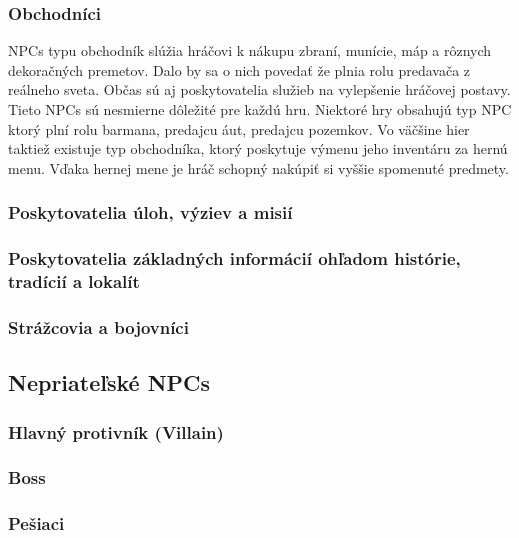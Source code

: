 \documentclass[10pt,twoside,slovak,a4paper]{article}
\begin{document}
\subsubsection{Obchodníci}
NPCs typu obchodník slúžia hráčovi k nákupu zbraní, munície, máp a rôznych dekoračných premetov. Dalo by sa o nich povedať že plnia rolu predavača z reálneho sveta. Občas sú aj poskytovatelia služieb na vylepšenie hráčovej postavy. Tieto NPCs sú nesmierne dôležité pre každú hru. Niektoré hry obsahujú typ NPC ktorý plní rolu barmana, predajcu áut, predajcu pozemkov. Vo väčšine hier taktiež existuje typ obchodníka, ktorý poskytuje výmenu jeho inventáru za hernú menu. Vďaka hernej mene je hráč schopný nakúpiť si vyššie spomenuté predmety.  


\subsubsection{Poskytovatelia úloh, výziev a misií}
\subsubsection{Poskytovatelia základných informácií ohľadom histórie, tradícií a lokalít}


\subsubsection{Strážcovia a bojovníci} \label{services}

\subsection{Nepriateľské NPCs} \label{enemy}

\subsubsection{Hlavný protivník (Villain)} \label{BOSS}

\subsubsection{Boss} \label{BOSS}

\subsubsection{Pešiaci} \label{Pesiaci}
\end{document}
